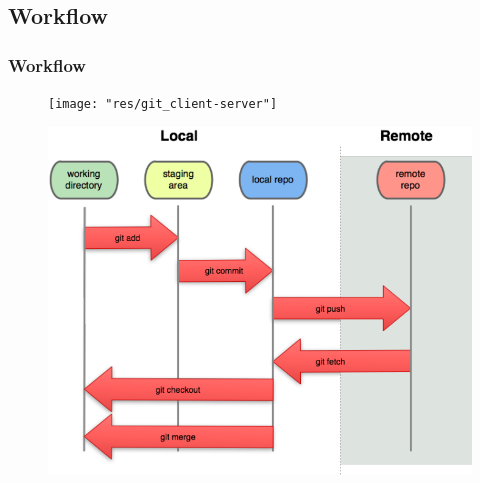     \subsection{Workflow}
    \begin{frame}[allowframebreaks=10] %
		\frametitle{Workflow}
        \begin{figure}
        	\centering
        	\texttt{[image: "res/git\_client-server"]} \\
        \end{figure}
        \framebreak
        \begin{figure}
        	\centering
        	\includegraphics[width=0.8\linewidth]{"res/git_flow"}
        \end{figure}
	\end{frame}
    
